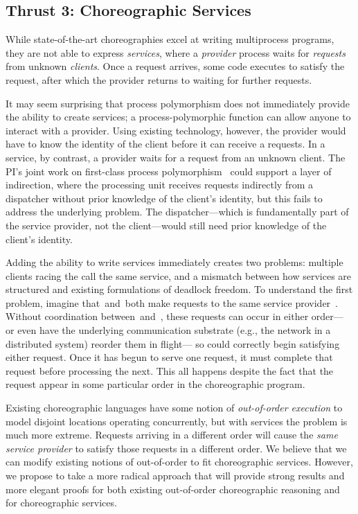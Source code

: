 \subsection{Thrust 3: Choreographic Services}
\label{sec:t3}

While state-of-the-art choreographies excel at writing multiprocess programs, they are not able to express \emph{services},
where a \emph{provider} process waits for \emph{requests} from unknown \emph{clients}.
Once a request arrives, some code executes to satisfy the request, after which the provider returns to waiting for further requests.

It may seem surprising that process polymorphism does not immediately provide the ability to create services;
a process-polymorphic function can allow anyone to interact with a provider.
Using existing technology, however, the provider would have to know the identity of the client before it can receive a requests.
In a service, by contrast, a provider waits for a request from an unknown client.
The PI's joint work on first-class process polymorphism~\cite{SamuelsonHC25} could support a layer of indirection,
where the processing unit receives requests indirectly from a dispatcher without prior knowledge of the client's identity,
but this fails to address the underlying problem.
The dispatcher---which is fundamentally part of the service provider, not the client---would still need prior knowledge of the client's identity.

Adding the ability to write services immediately creates two problems:
multiple clients racing the call the same service,
and a mismatch between how services are structured and existing formulations of deadlock freedom.
To understand the first problem, imagine that~\Alice and~\Bob both make requests to the same service provider~\Server.
Without coordination between~\Alice and~\Bob, these requests can occur in either order---%
or even have the underlying communication substrate (e.g., the network in a distributed system) reorder them in flight---%
so \Server could correctly begin satisfying either request.
Once it has begun to serve one request, it must complete that request before processing the next.
This all happens despite the fact that the request appear in some particular order in the choreographic program.

Existing choreographic languages have some notion of \emph{out-of-order execution}
to model disjoint locations operating concurrently, but with services the problem is much more extreme.
Requests arriving in a different order will cause the \emph{same service provider} to satisfy those requests in a different order.
We believe that we can modify existing notions of out-of-order to fit choreographic services.
However, we propose to take a more radical approach that will provide strong results and more elegant proofs
for both existing out-of-order choreographic reasoning and for choreographic services.

